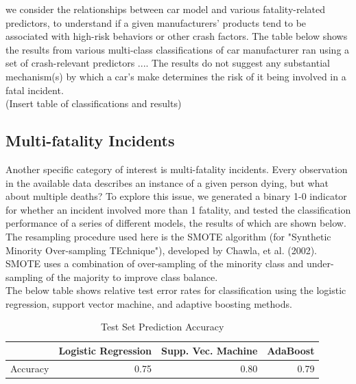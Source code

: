 \documentclass[11pt, oneside,titlepage]{article}   	%
\begin{document}
we consider the relationships between car model and various fatality-related predictors, to understand if a given manufacturers' products tend to be associated with high-risk behaviors or other crash factors. The table below shows the results from various multi-class classifications of car manufacturer ran using a set of crash-relevant predictors .... The results do not suggest any substantial mechanism(s) by which a car's make determines the risk of it being involved in a fatal incident. \\

(Insert table of classifications and results) \\






\subsection*{Multi-fatality Incidents}
Another specific category of interest is multi-fatality incidents. Every observation in the available data describes an instance of a given person dying, but what about multiple deaths? To explore this issue, we generated a binary 1-0 indicator for whether an incident involved more than 1 fatality, and tested the classification performance of a series of different models, the results of which are shown below. The resampling procedure used here is the SMOTE algorithm (for "Synthetic Minority Over-sampling TEchnique"), developed by Chawla, et al. (2002). SMOTE uses a combination of over-sampling of the minority class and under-sampling of the majority to improve class balance. \\

The below table shows relative test error rates for classification using the logistic regression, support vector machine, and adaptive boosting methods. \\

\begin{table}[ht]
\centering
\begin{tabular}{rrrr}
  \hline
 & Logistic Regression & Supp. Vec. Machine & AdaBoost \\ 
  \hline
Accuracy & 0.75 & 0.80 & 0.79 \\ 
   \hline
\end{tabular}
\caption{Test Set Prediction Accuracy} 
\end{table}
\end{document}
